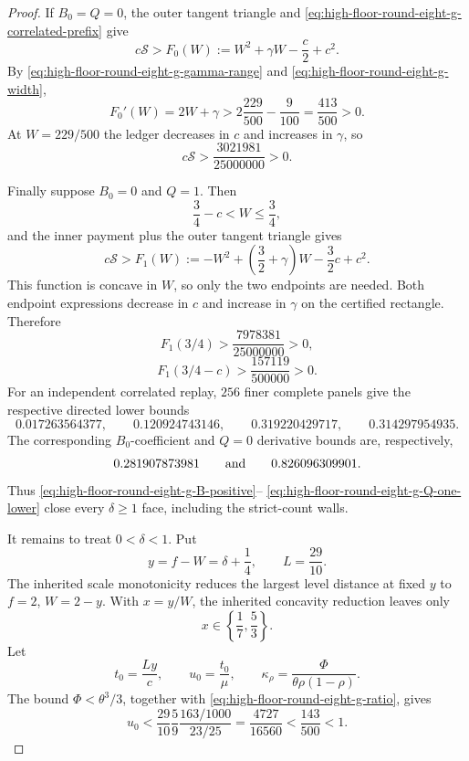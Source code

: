 \documentclass[11pt]{article}
\theoremstyle{remark}
\begin{document}
\begin{proof}
If $B_0=Q=0$, the outer tangent triangle and
\eqref{eq:high-floor-round-eight-g-correlated-prefix} give
\[
 c\mathcal S>
 F_0(W):=W^2+\gamma W-\frac c2+c^2.
\]
By \eqref{eq:high-floor-round-eight-g-gamma-range} and
\eqref{eq:high-floor-round-eight-g-width},
\[
 F_0'(W)=2W+\gamma>
 2\frac{229}{500}-\frac9{100}=\frac{413}{500}>0.
\]
At $W=229/500$ the ledger decreases in $c$ and increases in $\gamma$,
so
\begin{equation}
 \boxed{c\mathcal S>
 \frac{3021981}{25000000}>0.}
 \label{eq:high-floor-round-eight-g-Q-zero}
\end{equation}

Finally suppose $B_0=0$ and $Q=1$.  Then
\[
 \frac34-c<W\leq\frac34,
\]
and the inner payment plus the outer tangent triangle gives
\[
 c\mathcal S>
 F_1(W):=-W^2+\left(\frac32+\gamma\right)W
 -\frac32c+c^2.
\]
This function is concave in $W$, so only the two endpoints are needed.
Both endpoint expressions decrease in $c$ and increase in $\gamma$ on
the certified rectangle.  Therefore
\begin{equation}
 \boxed{
 F_1(3/4)>\frac{7978381}{25000000}>0,}
 \label{eq:high-floor-round-eight-g-Q-one-upper}
\end{equation}
\begin{equation}
 \boxed{
 F_1(3/4-c)>\frac{157119}{500000}>0.}
 \label{eq:high-floor-round-eight-g-Q-one-lower}
\end{equation}
For an independent correlated replay, $256$ finer complete panels give
the respective directed lower bounds
\[
 0.017263564377,\qquad 0.120924743146,\qquad
 0.319220429717,\qquad 0.314297954935.
\]
The corresponding $B_0$-coefficient and $Q=0$ derivative bounds are,
respectively,
\[
 0.281907873981\qquad\hbox{and}\qquad0.826096309901.
\]
Thus
\eqref{eq:high-floor-round-eight-g-B-positive}--%
\eqref{eq:high-floor-round-eight-g-Q-one-lower} close every
$\delta\geq1$ face, including the strict-count walls.

It remains to treat $0<\delta<1$.  Put
\[
 y=f-W=\delta+\frac14,\qquad L=\frac{29}{10}.
\]
The inherited scale monotonicity reduces the largest level distance at
fixed $y$ to $f=2$, $W=2-y$.  With $x=y/W$, the inherited concavity
reduction leaves only
\begin{equation}
 x\in\left\{\frac17,\frac53\right\}.
 \label{eq:high-floor-round-eight-g-x-endpoints}
\end{equation}
Let
\[
 t_0=\frac{Ly}{c},\qquad u_0=\frac{t_0}{\mu},\qquad
 \kappa_\rho=\frac{\Phi}{\theta\rho(1-\rho)}.
\]
The bound $\Phi<\theta^3/3$, together with
\eqref{eq:high-floor-round-eight-g-ratio}, gives
\begin{equation}
 u_0<
 \frac{29}{10}\frac59\frac{163/1000}{23/25}
 =\frac{4727}{16560}<\frac{143}{500}<1.
 \label{eq:high-floor-round-eight-g-u-zero}
\end{equation}


\end{proof}
\end{document}
